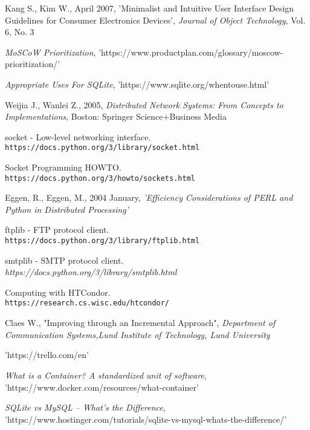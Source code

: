 \documentclass[10pt]{report}
\begin{document}
\begin{thebibliography}{9}
Kang S., Kim W., April 2007,
'Minimalist and Intuitive User Interface Design Guidelines for Consumer Electronics Devices', \textit{Journal of Object Technology}, Vol. 6, No. 3

\textit{MoSCoW Prioritization}, 'https://www.productplan.com/glossary/moscow-prioritization/'

\textit{Appropriate Uses For SQLite}, 'https://www.sqlite.org/whentouse.html'

Weijia J., Wanlei Z., 2005,
\textit{Distributed Network Systems: From Concepts to Implementations},
Boston: Springer Science+Business Media

socket - Low-level networking interface. \\\texttt{https://docs.python.org/3/library/socket.html}

Socket Programming HOWTO. \\\texttt{https://docs.python.org/3/howto/sockets.html}

Eggen, R., Eggen, M., 2004 January,
\textit{'Efficiency Considerations of  PERL and Python in Distributed Processing'}

ftplib - FTP protocol client. \\\texttt{https://docs.python.org/3/library/ftplib.html}

smtplib - SMTP protocol client.
\\\textit{https://docs.python.org/3/library/smtplib.html}

Computing with HTCondor. \\\texttt{https://research.cs.wisc.edu/htcondor/}

Claes W., "Improving through an Incremental Approach",
\textit{Department of Communication Systems,Lund Institute of Technology, Lund University}

'https://trello.com/en'

\textit{What is a Container? A standardized unit of software}, 'https://www.docker.com/resources/what-container'

\textit{SQLite vs MySQL – What’s the Difference}, 'https://www.hostinger.com/tutorials/sqlite-vs-mysql-whats-the-difference/'

\end{thebibliography}
\end{document}
